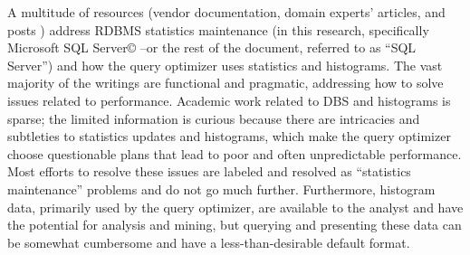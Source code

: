 \documentclass[sigconf]{acmart}
\begin{document}

A multitude of resources (vendor documentation, domain experts' articles, and posts \cite{RWesta, RWestb, RWestc}) address RDBMS statistics maintenance (in this research, specifically Microsoft SQL Server© --or the rest of the document, referred to as “SQL Server”) and how the query optimizer uses statistics and histograms. The vast majority of the writings are functional and pragmatic, addressing how to solve issues related to performance. Academic work related to DBS and histograms is sparse; the limited information is curious because there are intricacies and subtleties to statistics updates and histograms, which make the query optimizer choose questionable plans that lead to poor and often unpredictable performance. Most efforts to resolve these issues are labeled and resolved as “statistics maintenance” problems and do not go much further. Furthermore, histogram data, primarily used by the query optimizer, are available to the analyst and have the potential for analysis and mining, but querying and presenting these data can be somewhat cumbersome and have a less-than-desirable default format.
\end{document}
